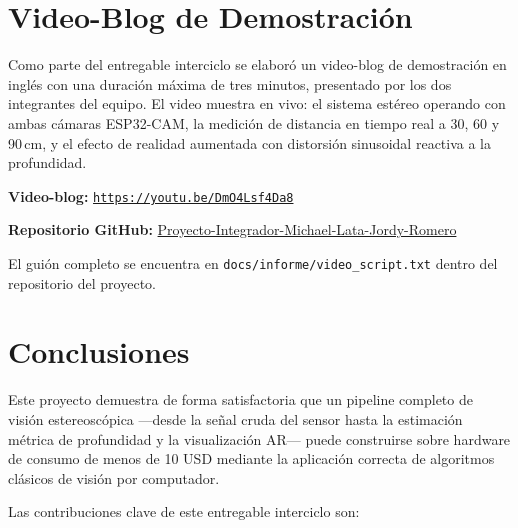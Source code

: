 \documentclass[12pt, a4paper]{article}
\begin{document}
\clearpage
\section{Video-Blog de Demostración}

Como parte del entregable interciclo se elaboró un video-blog de demostración en
inglés con una duración máxima de tres minutos, presentado por los dos integrantes
del equipo. El video muestra en vivo: el sistema estéreo operando con ambas cámaras
ESP32-CAM, la medición de distancia en tiempo real a 30, 60 y 90\,cm, y el efecto
de realidad aumentada con distorsión sinusoidal reactiva a la profundidad.

\begin{center}
\textbf{Video-blog:}\quad
\href{https://youtu.be/DmO4Lsf4Da8}{\texttt{https://youtu.be/DmO4Lsf4Da8}}

\medskip
\textbf{Repositorio GitHub:}\quad
\href{https://github.com/Whiteherobot/Proyecto-Integrador-Michael-Lata-Jordy-Romero}{Proyecto-Integrador-Michael-Lata-Jordy-Romero}
\end{center}

\noindent El guión completo se encuentra en \texttt{docs/informe/video\_script.txt}
dentro del repositorio del proyecto.

\section{Conclusiones}

Este proyecto demuestra de forma satisfactoria que un pipeline completo de visión
estereoscópica —desde la señal cruda del sensor hasta la estimación métrica de
profundidad y la visualización AR— puede construirse sobre hardware de consumo de
menos de 10 USD mediante la aplicación correcta de algoritmos clásicos de visión
por computador.

Las contribuciones clave de este entregable interciclo son:
\end{document}
